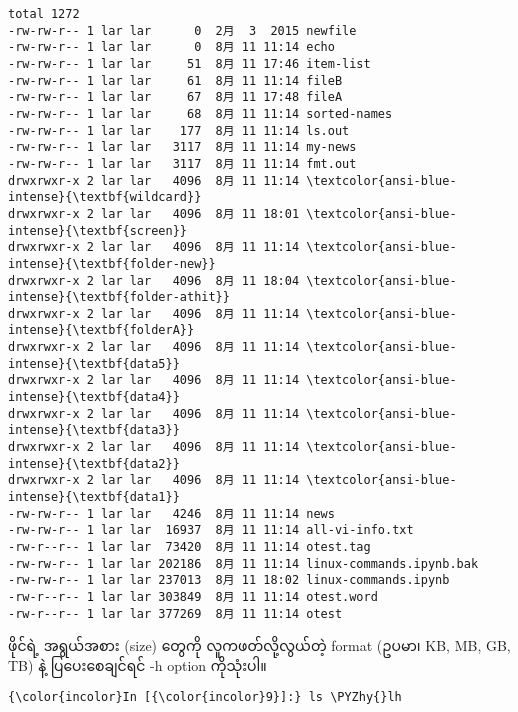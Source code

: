\documentclass[11pt]{article}
\def\PYZhy{\char`\-}
\begin{document}
    \begin{Verbatim}[commandchars=\\\{\}]
total 1272
-rw-rw-r-- 1 lar lar      0  2月  3  2015 newfile
-rw-rw-r-- 1 lar lar      0  8月 11 11:14 echo
-rw-rw-r-- 1 lar lar     51  8月 11 17:46 item-list
-rw-rw-r-- 1 lar lar     61  8月 11 11:14 fileB
-rw-rw-r-- 1 lar lar     67  8月 11 17:48 fileA
-rw-rw-r-- 1 lar lar     68  8月 11 11:14 sorted-names
-rw-rw-r-- 1 lar lar    177  8月 11 11:14 ls.out
-rw-rw-r-- 1 lar lar   3117  8月 11 11:14 my-news
-rw-rw-r-- 1 lar lar   3117  8月 11 11:14 fmt.out
drwxrwxr-x 2 lar lar   4096  8月 11 11:14 \textcolor{ansi-blue-intense}{\textbf{wildcard}}
drwxrwxr-x 2 lar lar   4096  8月 11 18:01 \textcolor{ansi-blue-intense}{\textbf{screen}}
drwxrwxr-x 2 lar lar   4096  8月 11 11:14 \textcolor{ansi-blue-intense}{\textbf{folder-new}}
drwxrwxr-x 2 lar lar   4096  8月 11 18:04 \textcolor{ansi-blue-intense}{\textbf{folder-athit}}
drwxrwxr-x 2 lar lar   4096  8月 11 11:14 \textcolor{ansi-blue-intense}{\textbf{folderA}}
drwxrwxr-x 2 lar lar   4096  8月 11 11:14 \textcolor{ansi-blue-intense}{\textbf{data5}}
drwxrwxr-x 2 lar lar   4096  8月 11 11:14 \textcolor{ansi-blue-intense}{\textbf{data4}}
drwxrwxr-x 2 lar lar   4096  8月 11 11:14 \textcolor{ansi-blue-intense}{\textbf{data3}}
drwxrwxr-x 2 lar lar   4096  8月 11 11:14 \textcolor{ansi-blue-intense}{\textbf{data2}}
drwxrwxr-x 2 lar lar   4096  8月 11 11:14 \textcolor{ansi-blue-intense}{\textbf{data1}}
-rw-rw-r-- 1 lar lar   4246  8月 11 11:14 news
-rw-rw-r-- 1 lar lar  16937  8月 11 11:14 all-vi-info.txt
-rw-r--r-- 1 lar lar  73420  8月 11 11:14 otest.tag
-rw-rw-r-- 1 lar lar 202186  8月 11 11:14 linux-commands.ipynb.bak
-rw-rw-r-- 1 lar lar 237013  8月 11 18:02 linux-commands.ipynb
-rw-r--r-- 1 lar lar 303849  8月 11 11:14 otest.word
-rw-r--r-- 1 lar lar 377269  8月 11 11:14 otest

    \end{Verbatim}

    ဖိုင်ရဲ့ အရွယ်အစား (size) တွေကို လူကဖတ်လို့လွယ်တဲ့ format (ဥပမာ၊ KB, MB,
GB, TB) နဲ့ ပြပေးစေချင်ရင် -h option ကိုသုံးပါ။

    \begin{Verbatim}[commandchars=\\\{\}]
{\color{incolor}In [{\color{incolor}9}]:} ls \PYZhy{}lh
\end{Verbatim}
\end{document}
